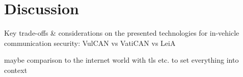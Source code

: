 
\section{Discussion}
\label{sec:discussion}

Key trade-offs \& considerations on the presented technologies for in-vehicle
communication security: VulCAN vs VatiCAN vs LeiA

maybe comparison to the internet world with tls etc. to set everything into context
